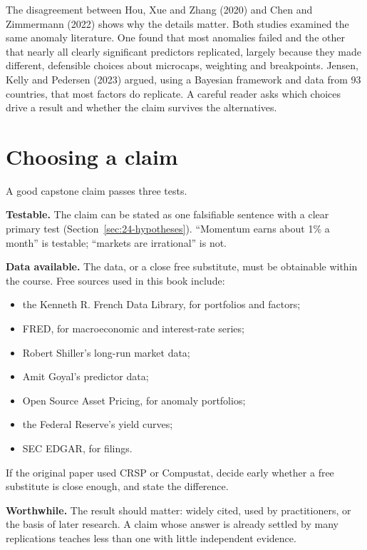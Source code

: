 The disagreement between Hou, Xue and Zhang (2020) and Chen and Zimmermann (2022) shows why the details matter. Both studies examined the same anomaly literature. One found that most anomalies failed and the other that nearly all clearly significant predictors replicated, largely because they made different, defensible choices about microcaps, weighting and breakpoints. Jensen, Kelly and Pedersen (2023) argued, using a Bayesian framework and data from 93 countries, that most factors do replicate. A careful reader asks which choices drive a result and whether the claim survives the alternatives.

\section{Choosing a claim}
\label{sec:24-choosing}

A good capstone claim passes three tests.

\textbf{Testable.} The claim can be stated as one falsifiable sentence with a clear primary test (Section~\ref{sec:24-hypotheses}). ``Momentum earns about 1\% a month'' is testable; ``markets are irrational'' is not.

\textbf{Data available.} The data, or a close free substitute, must be obtainable within the course. Free sources used in this book include:

\begin{itemize}
  \item the Kenneth R. French Data Library, for portfolios and factors;
  \item FRED, for macroeconomic and interest-rate series;
  \item Robert Shiller's long-run market data;
  \item Amit Goyal's predictor data;
  \item Open Source Asset Pricing, for anomaly portfolios;
  \item the Federal Reserve's yield curves;
  \item SEC EDGAR, for filings.
\end{itemize}

If the original paper used CRSP or Compustat, decide early whether a free substitute is close enough, and state the difference.

\textbf{Worthwhile.} The result should matter: widely cited, used by practitioners, or the basis of later research. A claim whose answer is already settled by many replications teaches less than one with little independent evidence.

